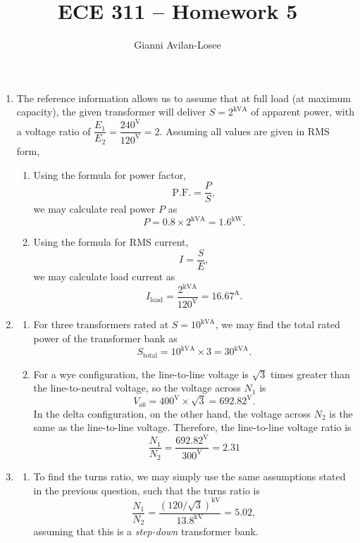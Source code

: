\documentclass{article}
\title{ECE 311 -- Homework 5}
\author{Gianni Avilan-Losee}
\begin{document}

\begin{enumerate}[label=\thesubsection]
	\setcounter{section}{11}
	\setcounter{subsection}{2}
	\item The reference information allows us to assume that at full load (at maximum capacity), the given transformer will deliver \(S = 2^{\mathrm{kVA}}\) of apparent power, with a voltage ratio of \(\dfrac{E_1}{E_2}=\dfrac{240^{\mathrm{V}}}{120^{\mathrm{V}}} = 2\).
		Assuming all values are given in RMS form,
	\begin{enumerate}[label=\alph*)]
		\item Using the formula for power factor, 
			\[
				\mathrm{P.F.} = \frac{P}{S},
			\]
			we may calculate real power \(P\) as 
			\[
				P = 0.8 \times 2^{\mathrm{kVA}} = 1.6^{\mathrm{kW}}.
			\]
		\item Using the formula for RMS current,
			\[
			  I = \frac{S}{E}, 
			\]
			we may calculate load current as 
			\[
				I_{\mathrm{load}} = \frac{2^{\mathrm{kVA}}}{120^{\mathrm{V}}} = 16.67^{\mathrm{A}}.
			\]
	\end{enumerate}
	\setcounter{subsection}{5}
	\item
	\begin{enumerate}[label=\alph*)]
			\item For three transformers rated at \(S = 10^{\mathrm{kVA}}\), we may find the total rated power of the transformer bank as
				\[
					S_{\mathrm{total}} = 10^{\mathrm{kVA}} \times 3 = 30^{\mathrm{kVA}}.
				\]
			\item For a wye configuration, the line-to-line voltage is \(\sqrt{3}\) times greater than the line-to-neutral voltage, so the voltage across \(N_1\) is
				\[
					V_{ab} = 400^{\mathrm{V}} \times \sqrt{3} = 692.82^{\mathrm{V}}.
				\]
				In the delta configuration, on the other hand, the voltage across \(N_2\) is the same as the line-to-line voltage. Therefore, the line-to-line voltage ratio is
				\[
					\frac{N_1}{N_2} = \frac{692.82^{\mathrm{V}}}{300^{\mathrm{V}}} = 2.31
				\]
		\end{enumerate}
		\setcounter{subsection}{7}
		\item
			\begin{enumerate}[label=\alph*)]
				\item To find the turns ratio, we may simply use the same assumptions stated in the previous question, such that the turns ratio is
					\[
						\frac{N_1}{N_2} = \frac{(120/\sqrt{3})^{\mathrm{kV}}}{13.8^{\mathrm{kV}}} = 5.02,
					\]
					assuming that this is a \textit{step-down} transformer bank.

\end{enumerate}
\end{enumerate}
\end{document}
